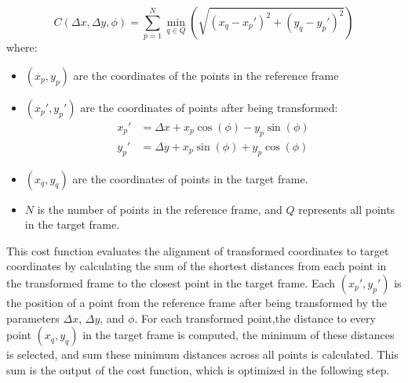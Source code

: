 \documentclass{micro-econ-thesis}
\begin{document}
\begin{equation}
	C(\Delta x, \Delta y, \phi) = \sum_{p=1}^{N} \min_{q \in Q} \left( \sqrt{(x_q - x_p')^2 + (y_q - y_p')^2} \right)
	\label{eq:cost_func}
\end{equation}
where:
\begin{itemize}
	\item $ (x_p, y_p) $ are the coordinates of the points in the reference frame
	\item $(x_p', y_p')$ are the coordinates of points after being transformed:
	\begin{align*}
		x_p' &= \Delta x + x_p \cos(\phi) - y_p \sin(\phi) \\
		y_p' &= \Delta y + x_p \sin(\phi) + y_p \cos(\phi)
	\end{align*}
	\item $(x_q, y_q)$ are the coordinates of points in the target frame.
	\item $N$ is the number of points in the reference frame, and $Q$ represents all points in the target frame.
\end{itemize}

This cost function evaluates the alignment of transformed coordinates to target coordinates by calculating the sum of the shortest distances from each point in the transformed frame to the closest point in the target frame. Each $(x_p', y_p')$ is the position of a point from the reference frame after being transformed by the parameters $\Delta x$, $\Delta y$, and $\phi$. For each transformed point,the distance to every point $(x_q, y_q)$ in the target frame is computed, the minimum of these distances is selected, and sum these minimum distances across all points is calculated. This sum is the output of the cost function, which is optimized in the following step. 
\end{document}

